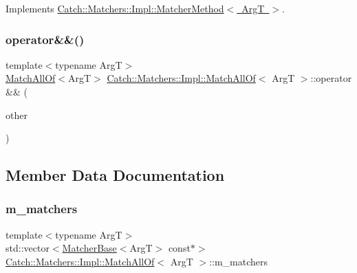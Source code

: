 Implements \mbox{\hyperlink{struct_catch_1_1_matchers_1_1_impl_1_1_matcher_method_ae0920ff9e817acf08e1bb0cbcb044e30}{Catch\+::\+Matchers\+::\+Impl\+::\+Matcher\+Method$<$ Arg\+T $>$}}.

\mbox{\label{struct_catch_1_1_matchers_1_1_impl_1_1_match_all_of_aa585510d47a76cd32178eec6000a41c9}} 
\subsubsection{\texorpdfstring{operator\&\&()}{operator\&\&()}}
{\footnotesize\ttfamily template$<$typename ArgT$>$ \\
\mbox{\hyperlink{struct_catch_1_1_matchers_1_1_impl_1_1_match_all_of}{Match\+All\+Of}}$<$ArgT$>$ \mbox{\hyperlink{struct_catch_1_1_matchers_1_1_impl_1_1_match_all_of}{Catch\+::\+Matchers\+::\+Impl\+::\+Match\+All\+Of}}$<$ ArgT $>$\+::operator \&\& (\begin{DoxyParamCaption}\item[{\mbox{\hyperlink{struct_catch_1_1_matchers_1_1_impl_1_1_matcher_base}{Matcher\+Base}}$<$ ArgT $>$ const \&}]{other }\end{DoxyParamCaption})\hspace{0.3cm}{\ttfamily [inline]}}



\subsection{Member Data Documentation}
\mbox{\label{struct_catch_1_1_matchers_1_1_impl_1_1_match_all_of_a98d6a2611f195a4a5c49f92fd877be9a}} 
\subsubsection{\texorpdfstring{m\+\_\+matchers}{m\_matchers}}
{\footnotesize\ttfamily template$<$typename ArgT$>$ \\
std\+::vector$<$\mbox{\hyperlink{struct_catch_1_1_matchers_1_1_impl_1_1_matcher_base}{Matcher\+Base}}$<$ArgT$>$ const$\ast$$>$ \mbox{\hyperlink{struct_catch_1_1_matchers_1_1_impl_1_1_match_all_of}{Catch\+::\+Matchers\+::\+Impl\+::\+Match\+All\+Of}}$<$ ArgT $>$\+::m\+\_\+matchers}



